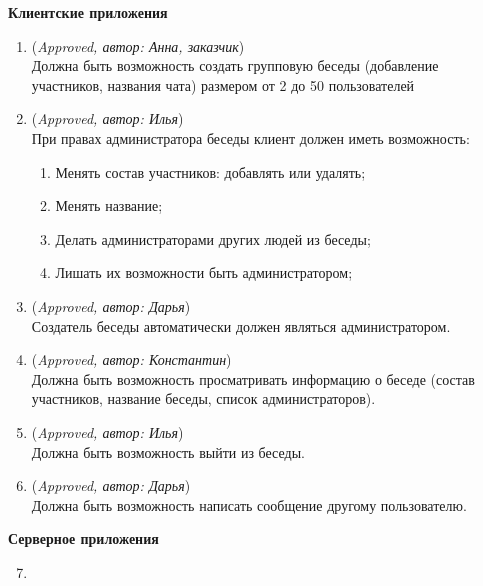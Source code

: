 \begin{enumerate}
	
	\textbf{Клиентские приложения}
	\begin{enumerate}
		\item (\textit{Approved, автор: Анна, заказчик})\\
		Должна быть возможность создать групповую беседы (добавление участников, названия чата) размером от 2 до 50 пользователей
		\item (\textit{Approved, автор: Илья})\\
		При правах администратора беседы клиент должен иметь возможность:
		\begin{enumerate}
			\item Менять состав участников: добавлять или удалять;
			\item Менять название;
			\item Делать администраторами других людей из беседы;
			\item Лишать их возможности быть администратором; 
		\end{enumerate}
		\item (\textit{Approved, автор: Дарья})\\
		Создатель беседы автоматически должен являться администратором.
		\item (\textit{Approved, автор: Константин})\\
		Должна быть возможность просматривать информацию о беседе (состав участников, название беседы, список администраторов).
		\item (\textit{Approved, автор: Илья})\\
		Должна быть возможность выйти из беседы. 
		\item (\textit{Approved, автор: Дарья})\\
		Должна быть возможность написать сообщение другому пользователю. 
	\end{enumerate}
		\textbf{Серверное приложения}
	\begin{enumerate}
		\setcounter{enumii}{6}
		\item {\color{red}{TODO взять у Ильи}}
	\end{enumerate}
	
	\end{enumerate}

\renewcommand{\labelenumi}{\arabic{enumi}.}

\renewcommand{\labelenumii}{\arabic{enumii}.}

\renewcommand{\labelenumiii}{\arabic{enumiii}.}
